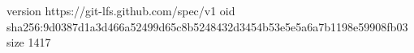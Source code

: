 version https://git-lfs.github.com/spec/v1
oid sha256:9d0387d1a3d466a52499d65c8b5248432d3454b53e5e5a6a7b1198e59908fb03
size 1417
